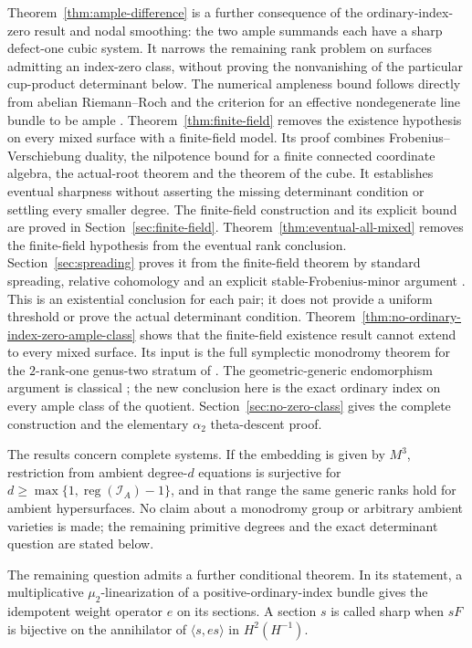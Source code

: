 \documentclass[11pt]{article}
\theoremstyle{definition}\newtheorem{definition}[theorem]{Definition}
\theoremstyle{remark}\newtheorem{remark}[theorem]{Remark}
\begin{document}
Theorem~\ref{thm:ample-difference} is a further consequence of the ordinary-index-zero result and nodal smoothing: the two ample summands each have a sharp defect-one cubic system. It narrows the remaining rank problem on surfaces admitting an index-zero class, without proving the nonvanishing of the particular cup-product determinant below. The numerical ampleness bound follows directly from abelian Riemann--Roch and the criterion for an effective nondegenerate line bundle to be ample \citep[Proposition~2.22, p.~25; Theorem~9.11, pp.~131--133]{EGM}. Theorem~\ref{thm:finite-field} removes the existence hypothesis on every mixed surface with a finite-field model. Its proof combines Frobenius--Verschiebung duality, the nilpotence bound for a finite connected coordinate algebra, the actual-root theorem and the theorem of the cube. It establishes eventual sharpness without asserting the missing determinant condition or settling every smaller degree. The finite-field construction and its explicit bound are proved in Section~\ref{sec:finite-field}. Theorem~\ref{thm:eventual-all-mixed} removes the finite-field hypothesis from the eventual rank conclusion. Section~\ref{sec:spreading} proves it from the finite-field theorem by standard spreading, relative cohomology and an explicit stable-Frobenius-minor argument \citep[Tags~01ZM, 0B91, 02O1 and 0D4E]{Stacks}. This is an existential conclusion for each pair; it does not provide a uniform threshold or prove the actual determinant condition. Theorem~\ref{thm:no-ordinary-index-zero-ample-class} shows that the finite-field existence result cannot extend to every mixed surface. Its input is the full symplectic monodromy theorem for the $2$-rank-one genus-two stratum of \citet[Theorem~4.5, author version pp.~14--15]{AchterPries}. The geometric-generic endomorphism argument is classical \citep[Corollary~4.2, p.~297]{Chai}; the new conclusion here is the exact ordinary index on every ample class of the quotient. Section~\ref{sec:no-zero-class} gives the complete construction and the elementary $\alpha_2$ theta-descent proof.

The results concern complete systems. If the embedding is given by $M^3$, restriction from ambient degree-$d$ equations is surjective for $d\ge\max\{1,\operatorname{reg}(\mathcal I_A)-1\}$, and in that range the same generic ranks hold for ambient hypersurfaces. No claim about a monodromy group or arbitrary ambient varieties is made; the remaining primitive degrees and the exact determinant question are stated below.

The remaining question admits a further conditional theorem. In its statement, a multiplicative $\mu _2$-linearization of a positive-ordinary-index bundle gives the idempotent weight operator $e$ on its sections. A section $s$ is called sharp when $sF$ is bijective on the annihilator of $\langle s,es\rangle$ in $H^2(H^{-1})$.
\end{document}
